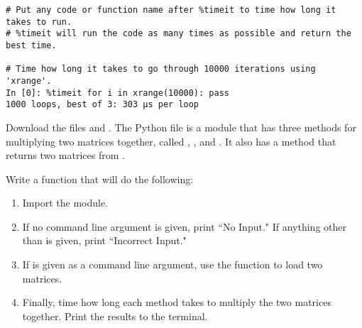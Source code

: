 \begin{lstlisting}
# Put any code or function name after %timeit to time how long it takes to run.
# %timeit will run the code as many times as possible and return the best time.

# Time how long it takes to go through 10000 iterations using 'xrange'.
In [0]: %timeit for i in xrange(10000): pass 
1000 loops, best of 3: 303 µs per loop
\end{lstlisting}

\begin{problem}
Download the files  and .
The Python file  is a module that has three methods for multiplying two matrices together, called , , and .
It also has a  method that returns two matrices from .

Write a function that will do the following:
\begin{enumerate}
\item Import the  module.
\item If no command line argument is given, print ``No Input."  If anything other than  is given, print ``Incorrect Input."
\item If  is given as a command line argument, use the  function to load two matrices.
\item Finally, time how long each method takes to multiply the two matrices together. Print the results to the terminal.
\end{enumerate}
\end{problem}
